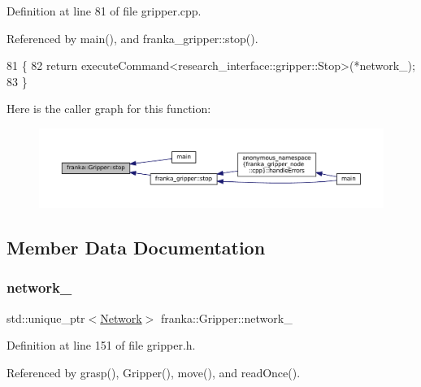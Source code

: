 Definition at line 81 of file gripper.\+cpp.



Referenced by main(), and franka\+\_\+gripper\+::stop().


\begin{DoxyCode}
81                          \{
82   \textcolor{keywordflow}{return} executeCommand<research\_interface::gripper::Stop>(*network\_);
83 \}
\end{DoxyCode}
Here is the caller graph for this function\+:
\nopagebreak
\begin{figure}[H]
\begin{center}
\leavevmode
\includegraphics[width=350pt]{classfranka_1_1Gripper_add7397fb6c5631650c139d26a85c8e1d_icgraph}
\end{center}
\end{figure}


\subsection{Member Data Documentation}
\mbox{\label{classfranka_1_1Gripper_a0d6702c45e61147da44b08dd757890df}} 
\subsubsection{\texorpdfstring{network\+\_\+}{network\_}}
{\footnotesize\ttfamily std\+::unique\+\_\+ptr$<$\hyperlink{classfranka_1_1Network}{Network}$>$ franka\+::\+Gripper\+::network\+\_\+\hspace{0.3cm}{\ttfamily [private]}}



Definition at line 151 of file gripper.\+h.



Referenced by grasp(), Gripper(), move(), and read\+Once().

\mbox{\label{classfranka_1_1Gripper_ae3698ae18399317ca4a7fc4154be602f}} 
